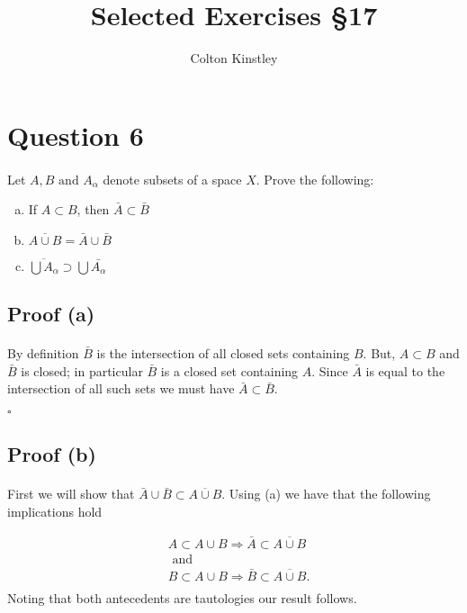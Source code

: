 \documentclass[11pt, oneside]{article}   	%
\title{Selected Exercises \S17}
\author{Colton Kinstley}
\newcommand{\tand}{\text{ and }}
\newcommand{\qed}{\begin{center}
$\square$
\end{center}}
\begin{document}
\maketitle

\section*{Question 6}
\paragraph{}

Let $A, B \tand A_{\alpha}$ denote subsets of a space $X$. Prove the following:
\begin{enumerate}[(a)]

\item
If $A \subset B$, then $\bar{A} \subset \bar{B}$
\item
$\overline{A \cup B} = \bar{A} \cup \bar{B}$
\item
$\overline{\bigcup A_\alpha} \supset \bigcup \bar{A_\alpha}$

\end{enumerate}

\subsection*{Proof (a)}
\paragraph{}

By definition $\bar{B}$ is the intersection of all closed sets containing $B$. But, $A \subset B$ and $\bar{B}$ is closed; in particular $\bar{B}$ is a closed set containing $A$. Since $\bar{A}$ is equal to the intersection of all such sets we must have $\bar{A} \subset \bar{B}$. \qed

\subsection*{Proof (b)}
\paragraph{}

First we will show that $\bar{A} \cup \bar{B} \subset \overline{A \cup B}$. Using (a) we have that the following implications hold

\begin{eqnarray*}
&A \subset A \cup B \Rightarrow \bar{A} \subset \overline{A \cup B} \\
&\tand \\
&B \subset A \cup B \Rightarrow \bar{B} \subset \overline{A \cup B}. \\
\end{eqnarray*}
Noting that both antecedents are tautologies our result follows.
\par{}
\end{document}
